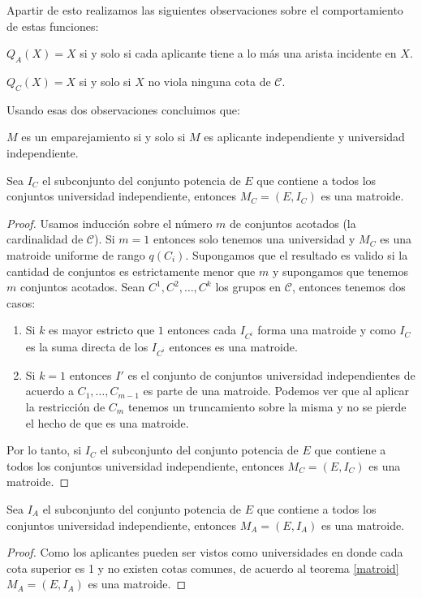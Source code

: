 Apartir de esto realizamos las siguientes observaciones sobre el comportamiento de estas funciones:

\begin{obs}
$Q_A(X)=X$ si y solo si cada aplicante tiene a lo más una arista incidente en $X$.
\end{obs}
\begin{obs}
$Q_C(X)=X$ si y solo si $X$ no viola ninguna cota de $\mathcal{C}$.
\end{obs}

Usando esas dos observaciones concluimos que:

\begin{obs}
$M$ es un emparejamiento si y solo si $M$ es aplicante independiente y universidad independiente. 
\end{obs}

\begin{teo}
\label{matroid}
Sea $I_C$ el subconjunto del conjunto potencia de $E$ que contiene a todos los conjuntos universidad independiente, entonces $M_C = (E,I_C)$ es una matroide. 
\end{teo}

\begin{proof}
Usamos inducción sobre el número $m$ de conjuntos acotados (la cardinalidad de $\mathcal{C}$). Si $m=1$ entonces solo tenemos una universidad y $M_C$ es una matroide uniforme de rango $q(C_i)$. 
Supongamos que el resultado es valido si la cantidad de conjuntos es estrictamente menor que $m$ y supongamos que tenemos $m$ conjuntos acotados. Sean $C^1,C^2,\dots, C^k$ los grupos en $\mathcal{C}$, entonces tenemos dos casos:
\begin{enumerate}
\item Si $k$ es mayor estricto que $1$ entonces cada $I_{C^i}$ forma una matroide y como $I_C$ es la suma directa de los $I_{C^i}$ entonces es una matroide. 
\item Si $k=1$ entonces $I'$ es el conjunto de conjuntos universidad independientes de acuerdo a $C_1,\dots,C_{m-1}$ es parte de una matroide. Podemos ver que al aplicar la restricción de $C_m$ tenemos un truncamiento sobre la misma y no se pierde el hecho de que es una matroide. 
\end{enumerate}
Por lo tanto, si $I_C$ el subconjunto del conjunto potencia de $E$ que contiene a todos los conjuntos universidad independiente, entonces $M_C = (E,I_C)$ es una matroide.
\end{proof}

\begin{cor}
Sea $I_A$ el subconjunto del conjunto potencia de $E$ que contiene a todos los conjuntos universidad independiente, entonces $M_A = (E,I_A)$ es una matroide. 
\end{cor}
\begin{proof}
Como los aplicantes pueden ser vistos como universidades en donde cada cota superior es 1 y no existen cotas comunes, de acuerdo al teorema \ref{matroid}  $M_A = (E,I_A)$ es una matroide. 
\end{proof}

